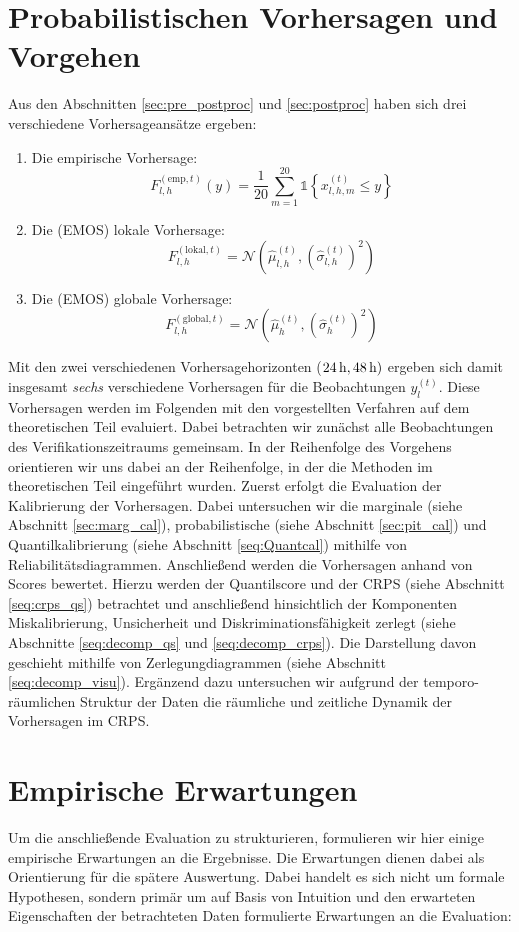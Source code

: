 \section{Probabilistischen Vorhersagen und Vorgehen}\label{sec:meth_eval}
Aus den Abschnitten \ref{sec:pre_postproc} und \ref{sec:postproc} haben sich drei verschiedene Vorhersageansätze ergeben:
\begin{enumerate}
\item Die empirische Vorhersage:
\[
F_{l,h}^{(\mathrm{emp},t)}(y)= \frac{1}{20}\sum_{m=1}^{20} \mathds{1}\!\left\{x_{l,h,m}^{(t)}\le y\right\}
\]

\item Die (EMOS) lokale Vorhersage:
\[
F_{l,h}^{(\mathrm{lokal},t)}=\mathcal{N}\!\left(\hat{\mu}_{l,h}^{(t)},(\hat{\sigma}_{l,h}^{(t)})^2\right)
\]

\item Die (EMOS) globale Vorhersage:
\[
F_{l,h}^{(\mathrm{global},t)}=\mathcal{N}\!\left(\hat{\mu}_{h}^{(t)},(\hat{\sigma}_{h}^{(t)})^2\right)
\]
\end{enumerate}
Mit den zwei verschiedenen Vorhersagehorizonten ($24\,\mathrm{h},48\,\mathrm{h})$ ergeben sich damit insgesamt \emph{sechs} verschiedene Vorhersagen für die Beobachtungen $y^{(t)}_l$. Diese Vorhersagen werden im Folgenden mit den vorgestellten Verfahren auf dem theoretischen Teil evaluiert. 
Dabei betrachten wir zunächst alle Beobachtungen des Verifikationszeitraums gemeinsam. In der Reihenfolge des Vorgehens orientieren wir uns dabei an der Reihenfolge, in der die Methoden im theoretischen Teil eingeführt wurden. Zuerst erfolgt die Evaluation der Kalibrierung der Vorhersagen. Dabei untersuchen wir die marginale (siehe Abschnitt \ref{sec:marg_cal}), probabilistische (siehe Abschnitt \ref{sec:pit_cal}) und Quantilkalibrierung (siehe Abschnitt \ref{seq:Quantcal}) mithilfe von Reliabilitätsdiagrammen. Anschließend werden die Vorhersagen anhand von Scores bewertet. Hierzu werden der Quantilscore und der CRPS (siehe Abschnitt \ref{seq:crps_qs}) betrachtet und anschließend hinsichtlich der Komponenten Miskalibrierung, Unsicherheit und Diskriminationsfähigkeit zerlegt (siehe Abschnitte \ref{seq:decomp_qs} und \ref{seq:decomp_crps}). Die Darstellung davon geschieht mithilfe von Zerlegungdiagrammen (siehe Abschnitt \ref{seq:decomp_visu}). 
Ergänzend dazu untersuchen wir aufgrund der temporo-räumlichen Struktur der Daten die räumliche und zeitliche Dynamik der Vorhersagen im CRPS.

\section{Empirische Erwartungen} \label{sec:meth_hp}
Um die anschließende Evaluation zu strukturieren, formulieren wir hier einige empirische Erwartungen an die Ergebnisse.
Die Erwartungen dienen dabei als Orientierung für die spätere Auswertung. Dabei handelt es sich nicht um formale Hypothesen, sondern primär um auf Basis von Intuition und den erwarteten Eigenschaften der betrachteten Daten formulierte Erwartungen an die Evaluation:

